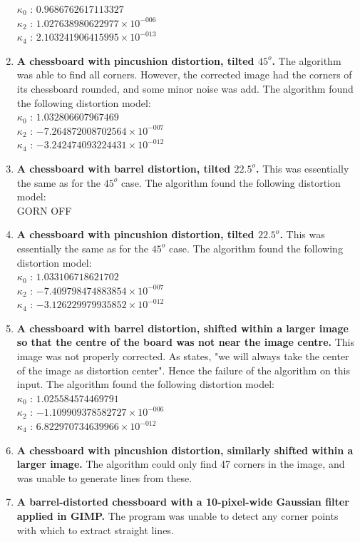 \begin{enumerate}
   $ \kappa_{0}$ : $0.9686762617113327$\\
   $ \kappa_{2}$ : $1.027638980622977 \times 10^{-006}$\\
   $ \kappa_{4}$ : $2.103241906415995 \times 10^{-013}$
  \item \textbf{A chessboard with pincushion distortion, tilted $45^o$.} The algorithm was able to find all corners. However, the corrected image had the corners of its chessboard rounded, and some minor noise was add. The algorithm found the following distortion model:\\
   $ \kappa_{0}$ : $1.032806607967469$\\
   $ \kappa_{2}$ : $-7.264872008702564 \times 10^{-007}$\\
   $ \kappa_{4}$ : $-3.242474093224431 \times 10^{-012}$
  \item \textbf{A chessboard with barrel distortion, tilted $22.5^o$.} This was essentially the same as for the $45^o$ case. The algorithm found the following distortion model:\\
GORN OFF\\
  \item \textbf{A chessboard with pincushion distortion, tilted $22.5^o$.} This was essentially the same as for the $45^o$ case. The algorithm found the following distortion model:\\
   $ \kappa_{0}$ : $1.033106718621702$\\
   $ \kappa_{2}$ : $-7.409798474883854 \times 10^{-007}$\\
   $ \kappa_{4}$ : $-3.126229979935852 \times 10^{-012}$
  \item \textbf{A chessboard with barrel distortion, shifted within a larger image so that the centre of the board was not near the image centre.} This image was not properly corrected. As \cite{algebraic-distortion} states, "we will always take the center of the image as distortion center". Hence the failure of the algorithm on this input. The algorithm found the following distortion model:\\
   $ \kappa_{0}$ : $1.025584574469791$\\
   $ \kappa_{2}$ : $-1.109909378582727 \times 10^{-006}$\\
   $ \kappa_{4}$ : $6.822970734639966 \times 10^{-012}$
  \item \textbf{A chessboard with pincushion distortion, similarly shifted within a larger image.} The algorithm could only find 47 corners in the image, and was unable to generate lines from these.
  \item \textbf{A barrel-distorted chessboard with a 10-pixel-wide Gaussian filter applied in GIMP.} The program was unable to detect any corner points with which to extract straight lines.

\end{enumerate}
